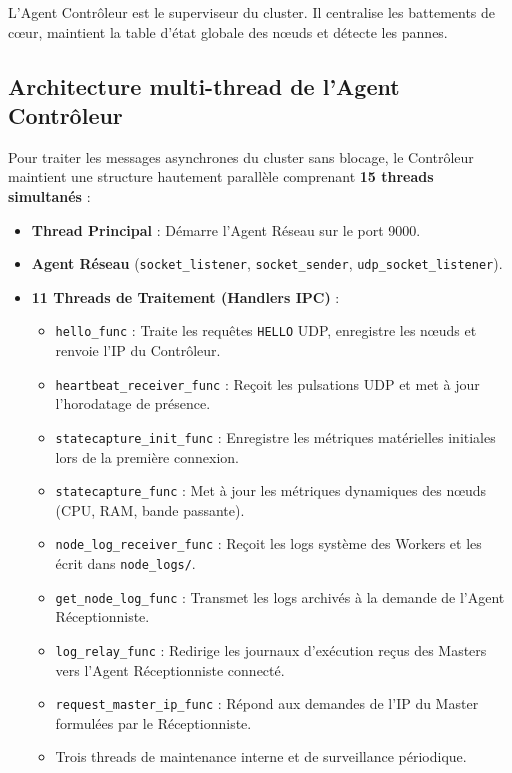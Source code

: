 \documentclass[12pt,a4paper]{report}
\begin{document}
L'Agent Contrôleur est le superviseur du cluster. Il centralise les battements de cœur, maintient la table d'état globale des nœuds et détecte les pannes.

\subsection{Architecture multi-thread de l'Agent Contrôleur}

Pour traiter les messages asynchrones du cluster sans blocage, le Contrôleur maintient une structure hautement parallèle comprenant \textbf{15 threads simultanés} :
\begin{itemize}
    \item \textbf{Thread Principal} : Démarre l'Agent Réseau sur le port 9000.
    \item \textbf{Agent Réseau} (\texttt{socket\_listener}, \texttt{socket\_sender}, \texttt{udp\_socket\_listener}).
    \item \textbf{11 Threads de Traitement (Handlers IPC)} :
        \begin{itemize}
            \item \texttt{hello\_func} : Traite les requêtes \texttt{HELLO} UDP, enregistre les nœuds et renvoie l'IP du Contrôleur.
            \item \texttt{heartbeat\_receiver\_func} : Reçoit les pulsations UDP et met à jour l'horodatage de présence.
            \item \texttt{statecapture\_init\_func} : Enregistre les métriques matérielles initiales lors de la première connexion.
            \item \texttt{statecapture\_func} : Met à jour les métriques dynamiques des nœuds (CPU, RAM, bande passante).
            \item \texttt{node\_log\_receiver\_func} : Reçoit les logs système des Workers et les écrit dans \texttt{node\_logs/}.
            \item \texttt{get\_node\_log\_func} : Transmet les logs archivés à la demande de l'Agent Réceptionniste.
            \item \texttt{log\_relay\_func} : Redirige les journaux d'exécution reçus des Masters vers l'Agent Réceptionniste connecté.
            \item \texttt{request\_master\_ip\_func} : Répond aux demandes de l'IP du Master formulées par le Réceptionniste.
            \item Trois threads de maintenance interne et de surveillance périodique.
        \end{itemize}
\end{itemize}
\end{document}
